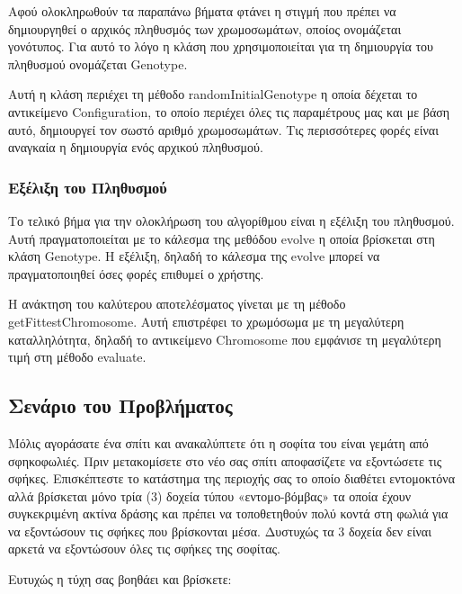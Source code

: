 Αφού ολοκληρωθούν τα παραπάνω βήματα φτάνει η στιγμή που πρέπει να δημιουργηθεί ο αρχικός πληθυσμός των χρωμοσωμάτων, οποίος ονομάζεται γονότυπος. Για αυτό το λόγο η κλάση που χρησιμοποιείται για τη δημιουργία του πληθυσμού ονομάζεται Genotype.

Αυτή η κλάση περιέχει τη μέθοδο randomInitialGenotype η οποία δέχεται το αντικείμενο Configuration, το οποίο περιέχει όλες τις παραμέτρους μας και με βάση αυτό, δημιουργεί τον σωστό αριθμό χρωμοσωμάτων. Τις περισσότερες φορές είναι αναγκαία η δημιουργία ενός αρχικού πληθυσμού.

\subsubsection{Εξέλιξη του Πληθυσμού}

Το τελικό βήμα για την ολοκλήρωση του αλγορίθμου είναι η εξέλιξη του πληθυσμού. Αυτή πραγματοποιείται με το κάλεσμα της μεθόδου evolve η οποία βρίσκεται στη κλάση Genotype. Η εξέλιξη, δηλαδή το κάλεσμα της evolve μπορεί να πραγματοποιηθεί όσες φορές επιθυμεί ο χρήστης.

Η ανάκτηση του καλύτερου αποτελέσματος γίνεται με τη μέθοδο getFittestChromosome. Αυτή επιστρέφει το χρωμόσωμα με τη μεγαλύτερη καταλληλότητα, δηλαδή το αντικείμενο Chromosome που εμφάνισε τη μεγαλύτερη τιμή στη μέθοδο evaluate.

\subsection{Σενάριο του Προβλήματος}

Μόλις αγοράσατε ένα σπίτι και ανακαλύπτετε ότι η σοφίτα του είναι γεμάτη από σφηκοφωλιές. Πριν μετακομίσετε στο νέο σας σπίτι αποφασίζετε να εξοντώσετε τις σφήκες. Επισκέπτεστε το κατάστημα της περιοχής σας το οποίο διαθέτει εντομοκτόνα αλλά βρίσκεται μόνο τρία (3) δοχεία τύπου «εντομο-βόμβας» τα οποία έχουν συγκεκριμένη
ακτίνα δράσης και πρέπει να τοποθετηθούν πολύ κοντά στη φωλιά για να εξοντώσουν τις σφήκες που βρίσκονται μέσα. Δυστυχώς τα 3 δοχεία δεν είναι αρκετά να εξοντώσουν όλες τις σφήκες της σοφίτας.

Ευτυχώς η τύχη σας βοηθάει και βρίσκετε:

